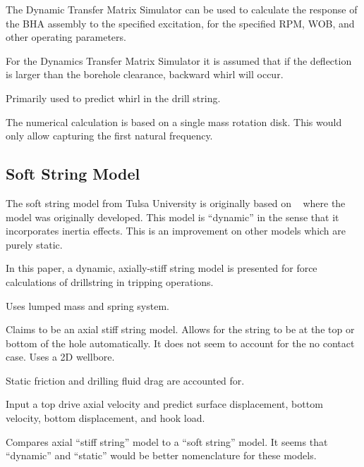 The Dynamic Transfer Matrix Simulator can be used to calculate the response of the BHA assembly to the specified excitation, for the specified RPM, WOB, and other operating parameters.

For the Dynamics Transfer Matrix Simulator it is assumed that if the deflection is larger than the borehole clearance, backward whirl will occur.

Primarily used to predict whirl in the drill string.

The numerical calculation is based on a single mass rotation disk.  This would only allow capturing the first natural frequency.

\notfinished{}


\subsection{Soft String Model}
The soft string model from Tulsa University is originally based on ~\cite{ref:miska2015a} where the model was originally developed.  This model is ``dynamic'' in the sense that it incorporates inertia effects.  This is an improvement on other models which are purely static.

\notfinished{}

\cite{ref:zamanipour2018a}

In this paper, a dynamic, axially-stiff string model is presented for force calculations of drillstring in tripping operations.

Uses lumped mass and spring system.

Claims to be an axial stiff string model.  Allows for the string to be at the top or bottom of the hole automatically.  It does not seem to account for the no contact case.
Uses a 2D wellbore.

Static friction and drilling fluid drag are accounted for.

Input a top drive axial velocity and predict surface displacement, bottom velocity, bottom displacement, and hook load.

Compares axial ``stiff string'' model to a ``soft string'' model.  It seems that ``dynamic'' and ``static'' would be better nomenclature for these models.



\notfinished{}